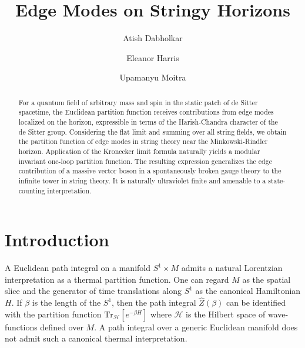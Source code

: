 \documentclass[aps,prl, reprint, superscriptaddress, 10pt]{revtex4-2}
\newcommand{\1}{\textbf{1}}
\newcommand{\Tr}{\mbox{Tr}}
\newcommand{\+}{{\,+ \,}}
\begin{document}
\title{Edge Modes on Stringy Horizons}

\preprint{}

\author{Atish Dabholkar}


\author{Eleanor Harris}


\author{Upamanyu Moitra}





\begin{abstract}

For a quantum field of arbitrary mass and spin in the static patch of de Sitter spacetime, the Euclidean partition function receives contributions from edge modes localized on the horizon, expressible in terms of the Harish-Chandra character of the de Sitter group. Considering the flat limit and summing over all string fields, we obtain the partition function of edge modes in string theory near the Minkowski-Rindler horizon. Application of the Kronecker limit formula naturally yields a modular invariant one-loop partition function. The resulting expression generalizes the edge contribution of a massive vector boson in a spontaneously broken gauge theory to the infinite tower in string theory. It is naturally ultraviolet finite and amenable to a state-counting interpretation.

\end{abstract}

\maketitle

\section{Introduction}\label{sec-introduction}

A Euclidean path integral on a manifold $S^1 \times M$ admits a natural Lorentzian interpretation as a thermal partition function. One can regard $M$ as the spatial slice and the generator of time translations along $S^1$ as the canonical Hamiltonian $H$. If $\beta$ is the length of the $S^1$, then the path integral $\hat{Z}(\beta)$ can be identified with the partition function $\Tr_{\mathcal{H}}[e^{-\beta H}]$ where $\mathcal{H}$ is the Hilbert space of wave-functions defined over $M$. A path integral over a generic Euclidean manifold does not admit such a canonical thermal interpretation.
\end{document}
